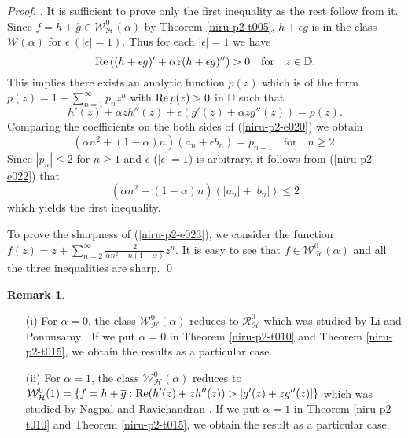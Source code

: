 \documentclass[a4paper,12pt]{amsart}
\theoremstyle{plain}
\theoremstyle{definition}
\newtheorem{rem}{Remark}[section]
\newenvironment{pf}[1][]{ \vskip 3mm
 \noindent
 \ifthenelse{\equal{#1}{}}  {{\slshape Proof. }}  {{\slshape #1.} } }{\qed\bigskip}
\begin{document}
\begin{pf}
It is sufficient to prove only the first inequality as the rest  follow from it.
 Since $f= h + \overline{g} \in \mathcal{W}^0_{\mathcal{H}}(\alpha)$  by Theorem \ref{niru-p2-t005}, $h + \epsilon g$ is in the class $\mathcal{W}(\alpha)$ for  $\epsilon ~(|\epsilon| =1)$. Thus for  each $|\epsilon| = 1$ we have
$$
{\rm Re\,}((h + \epsilon g)' + \alpha z (h + \epsilon g)'') > 0 \quad \mbox{for} \quad z\in\mathbb{D}.
$$
This implies there exists an analytic function $p(z)$ which is of the form $p(z) = 1 + \sum_{n = 1}^{\infty} p_n z^n$  with  ${\rm Re\,} p(z) > 0$ in $\mathbb{D}$ such that
\begin{equation}\label{niru-p2-e020}
h'(z) + \alpha z h''(z) + \epsilon (g'(z) + \alpha z g''(z)) = p(z).
\end{equation}
Comparing the coefficients on the both sides of (\ref{niru-p2-e020}) we obtain
\begin{equation}\label{niru-p2-e022}
(\alpha n^2 +(1 - \alpha)n)(a_n + \epsilon b_n) = p_{n-1}\quad \mbox{for}\quad n\geq2.
\end{equation}
Since $|p_n|\leq 2$ for  $n \geq 1$ and $\epsilon$ ($|\epsilon| = 1$) is arbitrary, it follows from (\ref{niru-p2-e022}) that
\begin{equation}\label{niru-p2-e023}
(\alpha n^2 +(1 - \alpha)n)(|a_n| + |b_n|) \leq 2
\end{equation}
which yields the first inequality.

To prove the sharpness of (\ref{niru-p2-e023}), we consider the function  $f(z) = z + \sum _{n = 2}^{\infty}\frac{2}{\alpha n^2 + n(1 - \alpha)}z^n$. It is easy to see that $f\in \mathcal{W}^0_{\mathcal{H}}(\alpha)$ and all the three inequalities are sharp.
\end{pf}

\begin{rem}
\begin{enumerate}
\item[(i)] For $\alpha = 0$, the class $\mathcal{W}^0_{\mathcal{H}}(\alpha)$ reduces to $\mathcal{R}^0_{\mathcal{H}}$ which was studied by Li and Ponnusamy \cite{Ponnusamy-Li-2013}. If we put  $\alpha = 0$ in Theorem \ref{niru-p2-t010} and Theorem \ref{niru-p2-t015}, we obtain the results
    \cite[Theorems 1 and 2]{Ponnusamy-Li-2013} as a particular case.

\item [(ii)] For $\alpha = 1$, the class $\mathcal{W}^0_{\mathcal{H}}(\alpha)$ reduces to $\mathcal{W}^0_{\mathcal{H}}(1) = \{f = h + \overline{g} : {\rm Re}(h'(z) + z h''(z))> |g'(z) + z g''(z)|\}$ which was studied by Nagpal and Ravichandran \cite{Nagpal-Ravichandran-2014}.  If we put $\alpha = 1$ in Theorem \ref{niru-p2-t010} and Theorem \ref{niru-p2-t015}, we obtain the result \cite[Theorm 3.5]{Nagpal-Ravichandran-2014} as a particular case.
\end{enumerate}
\end{rem}
\end{document}
